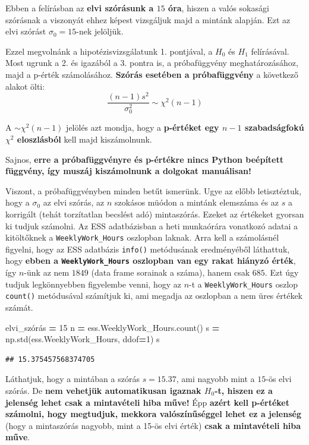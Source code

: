 \documentclass[
]{book}
\newenvironment{Shaded}{\begin{snugshade}}{\end{snugshade}}
\newcommand{\DecValTok}[1]{\textcolor[rgb]{0.00,0.00,0.81}{#1}}
\newcommand{\NormalTok}[1]{#1}
\newcommand{\OperatorTok}[1]{\textcolor[rgb]{0.81,0.36,0.00}{\textbf{#1}}}
\begin{document}
Ebben a felírásban az \textbf{elvi szórásunk a \(15\) óra}, hiszen a valós sokasági szórásnak a viszonyát ehhez képest vizsgáljuk majd a mintánk alapján. Ezt az elvi szórást \(\sigma_0=15\)-nek jelöljük.

Ezzel megvolnánk a hipotézisvizsgálatunk 1. pontjával, a \(H_0\) és \(H_1\) felírásával. Most ugrunk a 2. és igazából a 3. pontra is, a próbafüggvény meghatározásához, majd a p-érték számolásához. \textbf{Szórás esetében a próbafüggvény} a következő alakot ölti: \[\frac{(n-1)s^2}{\sigma_0^2} \sim \chi^2(n-1)\]

A \(\sim \chi^2(n-1)\) jelölés azt mondja, hogy a \textbf{p-értéket egy \(n-1\) szabadságfokú \(\chi^2\) eloszlásból} kell majd kiszámolnunk.

Sajnos, \textbf{erre a próbafüggvényre és p-értékre nincs Python beépített függvény, így muszáj kiszámolnunk a dolgokat manuálisan!}

Viszont, a próbafüggvényben minden betűt ismerünk. Ugye az előbb letisztéztuk, hogy a \(\sigma_0\) az elvi szórás, az \(n\) szokásos müódon a mintánk elemszáma és az \(s\) a korrigált (tehát torzítatlan becslést adó) mintaszórás. Ezeket az értékeket gyorsan ki tudjuk számolni. Az ESS adatbázisban a heti munkaórára vonatkozó adatai a kitöltőknek a \texttt{WeeklyWork\_Hours} oszlopban laknak. Arra kell a számolásnél figyelni, hogy az ESS adatbázis \texttt{info()} metódusának eredményéből láthattuk, hogy \textbf{ebben a \texttt{WeeklyWork\_Hours} oszlopban van egy rakat hiányzó érték}, így \(n\)-ünk az nem \(1849\) (data frame sorainak a száma), hanem csak \(685\). Ezt úgy tudjuk legkönnyebben figyelembe venni, hogy az \(n\)-t a \texttt{WeeklyWork\_Hours} oszlop \texttt{count()} metódusával számítjuk ki, ami megadja az oszlopban a nem üres értékek számát.

\begin{Shaded}
\begin{Highlighting}[]
\NormalTok{elvi\_szórás }\OperatorTok{=} \DecValTok{15}
\NormalTok{n }\OperatorTok{=}\NormalTok{ ess.WeeklyWork\_Hours.count()}
\NormalTok{s }\OperatorTok{=}\NormalTok{ np.std(ess.WeeklyWork\_Hours, ddof}\OperatorTok{=}\DecValTok{1}\NormalTok{)}
\NormalTok{s}
\end{Highlighting}
\end{Shaded}

\begin{verbatim}
## 15.375457568374705
\end{verbatim}

Láthatjuk, hogy a mintában a szórás \(s=15.37\), ami nagyobb mint a \(15\)-ös elvi szórás. De \textbf{nem vehetjük automatikusan igaznak \(H_0\)-t, hiszen ez a jelenség lehet csak a mintavételi hiba műve!} Épp \textbf{azért kell p-értéket számolni, hogy megtudjuk, mekkora valószínűséggel lehet ez a jelenség} (hogy a mintaszórás nagyobb, mint a 15-ös elvi érték) \textbf{csak a mintavételi hiba műve}.
\end{document}
